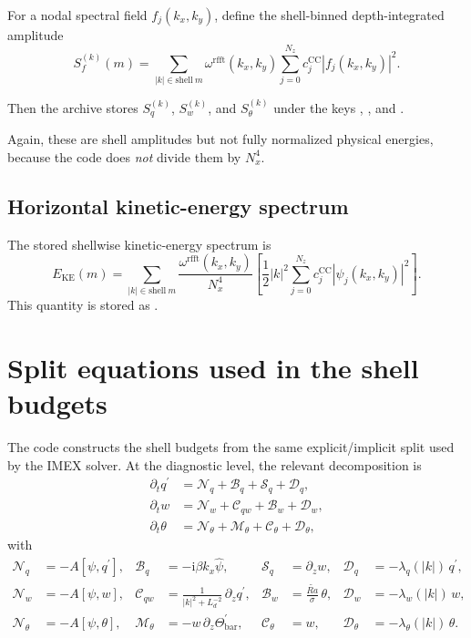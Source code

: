 \documentclass[11pt]{article}
\newcommand{\ii}{\mathrm{i}}
\newcommand{\cc}{c^{\mathrm{CC}}}
\newcommand{\rr}{\omega^{\mathrm{rfft}}}
\newcommand{\psihat}{\widehat{\psi}}
\begin{document}
For a nodal spectral field \(f_j(k_x,k_y)\), define the shell-binned
depth-integrated amplitude
\[
S_f^{(k)}(m)
=
\sum_{|k|\in \mathrm{shell}\ m}
\rr(k_x,k_y)
\sum_{j=0}^{N_z}\cc_j |f_j(k_x,k_y)|^2.
\]

Then the archive stores \(S_q^{(k)}\), \(S_w^{(k)}\), and \(S_{\theta}^{(k)}\)
under the keys , , and
.

Again, these are shell amplitudes but not fully normalized physical energies,
because the code does \emph{not} divide them by \(N_x^4\).

\subsection{Horizontal kinetic-energy spectrum}

The stored shellwise kinetic-energy spectrum is
\[
E_{\mathrm{KE}}(m)
=
\sum_{|k|\in \mathrm{shell}\ m}
\frac{\rr(k_x,k_y)}{N_x^4}
\left[
\frac12 |k|^2
\sum_{j=0}^{N_z}\cc_j |\psi_j(k_x,k_y)|^2
\right].
\]
This quantity is stored as .

\section{Split equations used in the shell budgets}

The code constructs the shell budgets from the same explicit/implicit split
used by the IMEX solver. At the diagnostic level, the relevant decomposition is
\begin{align*}
\partial_t q^{\prime}
&=
\mathcal{N}_q + \mathcal{B}_q + \mathcal{S}_q + \mathcal{D}_q,\\
\partial_t w
&=
\mathcal{N}_w + \mathcal{C}_{qw} + \mathcal{B}_w + \mathcal{D}_w,\\
\partial_t \theta
&=
\mathcal{N}_{\theta} + \mathcal{M}_{\theta} + \mathcal{C}_{\theta} + \mathcal{D}_{\theta},
\end{align*}
with
\begin{align*}
\mathcal{N}_q &= -A[\psi,q^{\prime}],&
\mathcal{B}_q &= -\ii \beta k_x \psihat,&
\mathcal{S}_q &= \partial_z w,&
\mathcal{D}_q &= -\lambda_q(|k|)\, q^{\prime},\\
\mathcal{N}_w &= -A[\psi,w],&
\mathcal{C}_{qw} &= \frac{1}{|k|^2 + L_d^{-2}}\,\partial_z q^{\prime},&
\mathcal{B}_w &= \frac{\widetilde{Ra}}{\sigma}\,\theta,&
\mathcal{D}_w &= -\lambda_w(|k|)\, w,\\
\mathcal{N}_{\theta} &= -A[\psi,\theta],&
\mathcal{M}_{\theta} &= -w\,\partial_z \Theta_{\mathrm{bar}}^{\prime},&
\mathcal{C}_{\theta} &= w,&
\mathcal{D}_{\theta} &= -\lambda_{\theta}(|k|)\,\theta.
\end{align*}
\end{document}
